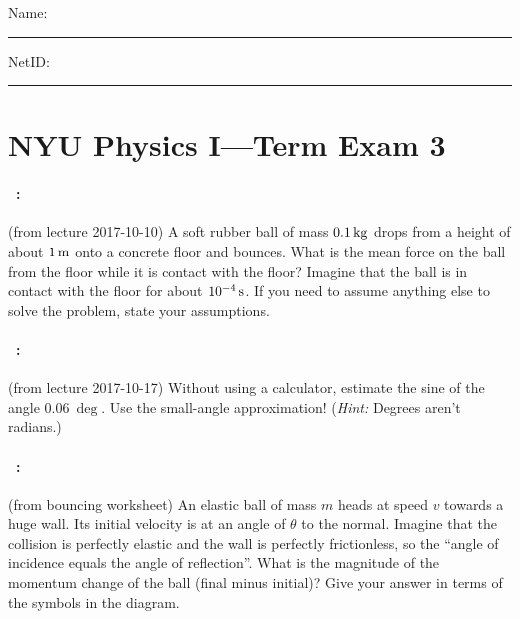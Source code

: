 \documentclass[12pt]{article}
\begin{document}
\noindent
Name: \rule[-1ex]{0.55\textwidth}{0.1pt}
NetID: \rule[-1ex]{0.2\textwidth}{0.1pt}

\section*{NYU Physics I---Term Exam 3}

\paragraph{\problemname~\theproblem:}%
(from lecture 2017-10-10)
A soft rubber ball of mass $0.1\,\mathrm{kg}$ drops from a height of about
$1\,\mathrm{m}$ onto a concrete floor and bounces. What is the mean force on
the ball from the floor while it is contact with the floor? Imagine
that the ball is in contact with the floor for about $10^{-4}\,\mathrm{s}$. If
you need to assume anything else to solve the problem, state your
assumptions.

\vfill

\paragraph{\problemname~\theproblem:}%
(from lecture 2017-10-17)
Without using a calculator, estimate the sine of the angle $0.06~\deg$.
Use the small-angle approximation! (\emph{Hint:} Degrees aren't radians.)

\vfill

\paragraph{\problemname~\theproblem:}%
(from bouncing worksheet)
An elastic ball of mass $m$ heads at speed $v$ towards a huge wall.
Its initial velocity is at an angle of $\theta$ to the normal.
Imagine that the collision is perfectly elastic and the
wall is perfectly frictionless, so the ``angle of incidence equals the
angle of reflection''. What is the magnitude of the momentum change of the ball (final
minus initial)?
Give your answer in terms of the symbols in the diagram.
\end{document}
